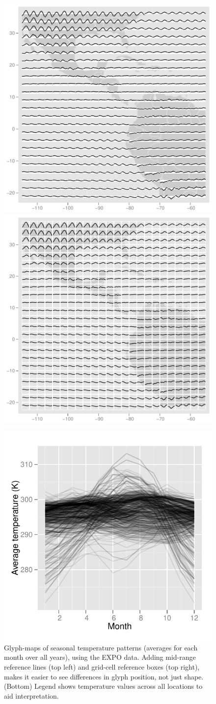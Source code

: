 \documentclass[oneside]{article}
\begin{document}

\begin{figure}[htbp]
  \centering
  \includegraphics[width=0.5\linewidth]{ref-line}%
  \includegraphics[width=0.5\linewidth]{ref-box}

  \includegraphics[width=0.33\linewidth]{ref-legend}

  \caption{Glyph-maps of seasonal temperature patterns (averages for each month over all years), using the EXPO data. Adding mid-range reference lines (top left) and grid-cell reference boxes (top right), makes it easier to see differences in glyph position, not just shape. (Bottom) Legend shows temperature values across all locations to aid interpretation.}
  \label{fig:ref-basic}
\end{figure}
\end{document}
